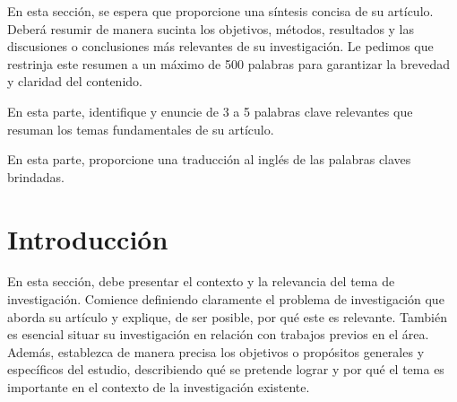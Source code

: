 \documentclass[fleqn]{Paquetes/RevDigMatEduInt}
\begin{document}
	
	\maketitle

\begin{resumen}
	En esta sección, se espera que proporcione una síntesis concisa de su artículo. Deberá resumir de manera sucinta los objetivos, métodos, resultados y las discusiones o conclusiones más relevantes de su investigación. Le pedimos que restrinja este resumen a un máximo de 500 palabras para garantizar la brevedad y claridad del contenido.
\end{resumen}

\begin{palabrasclave}
	En esta parte, identifique y enuncie de 3 a 5 palabras clave relevantes que resuman los temas fundamentales de su artículo.
\end{palabrasclave}

\begin{abstract}
	En esta sección, se espera que proporcione una traducción al inglés del resumen original. El abstract debe ser redactado en un inglés claro, preciso y de alta calidad, de manera que los lectores de habla inglesa puedan comprender de manera efectiva el contenido de su artículo.
\end{abstract}

\begin{keywords}
	En esta parte, proporcione una traducción al inglés de las palabras claves brindadas.
\end{keywords}

\section{Introducción}\label{sec:introduccion}

En esta sección, debe presentar el contexto y la relevancia del tema de investigación. Comience definiendo claramente el problema de investigación que aborda su artículo y explique, de ser posible, por qué este es relevante. También es esencial situar su investigación en relación con trabajos previos en el área. Además, establezca de manera precisa los objetivos o propósitos generales y específicos del estudio, describiendo qué se pretende lograr y por qué el tema es importante en el contexto de la investigación existente. 
\end{document}
